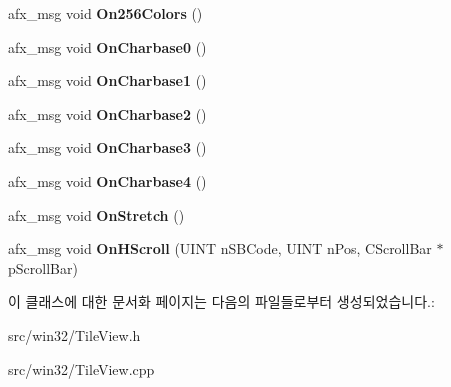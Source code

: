 \begin{DoxyCompactItemize}
afx\+\_\+msg void {\bfseries On256\+Colors} ()
\item 
\mbox{\label{class_tile_view_a5b1b1e61396178f21ee28c6c7a779142}} 
afx\+\_\+msg void {\bfseries On\+Charbase0} ()
\item 
\mbox{\label{class_tile_view_a4c2151cc553eabc4d08f8a8b6954aa72}} 
afx\+\_\+msg void {\bfseries On\+Charbase1} ()
\item 
\mbox{\label{class_tile_view_ab50f2c2c7575222ee7e4bb72161bbda7}} 
afx\+\_\+msg void {\bfseries On\+Charbase2} ()
\item 
\mbox{\label{class_tile_view_af0ec3a1a2c7e142612fe13d85c4faa63}} 
afx\+\_\+msg void {\bfseries On\+Charbase3} ()
\item 
\mbox{\label{class_tile_view_abfd5f9562f84ae4903db87425788d410}} 
afx\+\_\+msg void {\bfseries On\+Charbase4} ()
\item 
\mbox{\label{class_tile_view_afe0a1c444008b7e76d4669ffdda2e0bd}} 
afx\+\_\+msg void {\bfseries On\+Stretch} ()
\item 
\mbox{\label{class_tile_view_a8ca2f73ad6c372183494c0870905b9ac}} 
afx\+\_\+msg void {\bfseries On\+H\+Scroll} (U\+I\+NT n\+S\+B\+Code, U\+I\+NT n\+Pos, C\+Scroll\+Bar $\ast$p\+Scroll\+Bar)
\end{DoxyCompactItemize}


이 클래스에 대한 문서화 페이지는 다음의 파일들로부터 생성되었습니다.\+:\begin{DoxyCompactItemize}
\item 
src/win32/Tile\+View.\+h\item 
src/win32/Tile\+View.\+cpp\end{DoxyCompactItemize}
